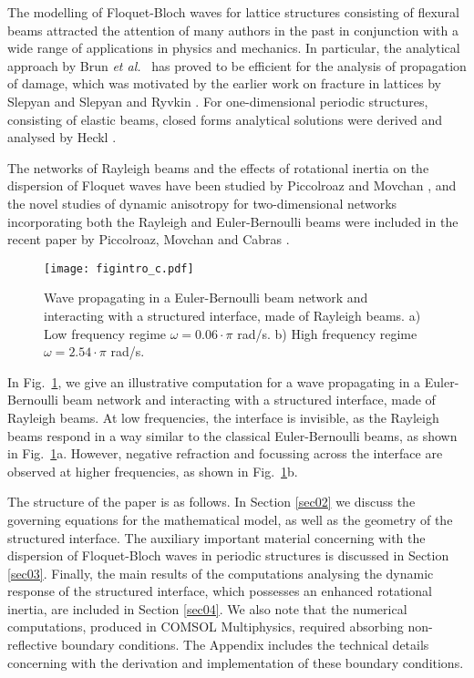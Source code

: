 \documentclass[11pt]{article}
\begin{document}
The modelling of Floquet-Bloch waves for lattice structures consisting of flexural beams attracted the attention of many authors in the past in conjunction with a wide range of applications in physics and mechanics. In particular,  the analytical approach by Brun {\em et al.}~\cite{Brun_2013} has proved to be efficient for the analysis of propagation of damage, which was motivated by the earlier work on fracture in lattices by  Slepyan \cite{Slepyan_2002} and Slepyan and Ryvkin \cite{Slepyan_Ryvkin_2010}. For one-dimensional periodic structures, consisting of elastic beams, closed forms analytical solutions were derived and analysed by
Heckl \cite{Heckl_2002}.

The networks of Rayleigh beams and the effects of rotational inertia on the dispersion of Floquet waves have been studied by Piccolroaz and Movchan \cite{PM_2014}, and the novel studies of dynamic anisotropy for two-dimensional networks incorporating both the Rayleigh and Euler-Bernoulli beams were included in the recent paper by Piccolroaz, Movchan and Cabras \cite{PMC_2016}.

\begin{figure}[!htb]
\centering
\texttt{[image: figintro\_c.pdf]}
\caption{\footnotesize Wave propagating in a Euler-Bernoulli beam network and interacting with a structured interface, made of Rayleigh beams. a) Low frequency regime $\omega=0.06\!\cdot\!\pi$ rad/s. b) High frequency regime $\omega=2.54\!\cdot\!\pi$ rad/s.}
\label{figINTRO}
\end{figure}

In Fig.~\ref{figINTRO}, we give an illustrative computation for a wave propagating in a Euler-Bernoulli beam network and interacting with a structured interface, made of Rayleigh beams. At low frequencies, the interface is invisible, as the Rayleigh beams respond in a way similar to the classical Euler-Bernoulli beams, as shown in Fig.~\ref{figINTRO}a. However, negative refraction and focussing across the interface are observed at higher frequencies, as shown in Fig.~\ref{figINTRO}b.

The structure of the paper is as follows. In Section \ref{sec02} we discuss the governing equations for the mathematical model, as well as the geometry of the structured interface.
The auxiliary important material concerning with the dispersion of Floquet-Bloch waves in periodic structures is discussed in Section  \ref{sec03}.
Finally, the main results of the computations analysing the dynamic response of the structured interface, which possesses an enhanced rotational inertia, are included in Section \ref{sec04}.
We also note that the numerical computations, produced in COMSOL Multiphysics, required absorbing non-reflective boundary conditions. The Appendix includes the technical details concerning with the derivation and implementation of these boundary conditions.
\end{document}
